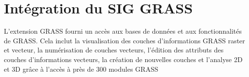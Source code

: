 
\section{Intégration du SIG GRASS}\label{sec:grass}


L'extension GRASS fourni un accès aux bases de données et aux fonctionnalités de GRASS. Cela inclut la visualisation des couches d'informations GRASS raster et vecteur, la numérisation de couches vecteurs, l'édition des attributs des couches d'informations vecteurs, la création de nouvelles couches et l'analyse 2D et 3D grâce à l'accès à près de 300 modules GRASS

